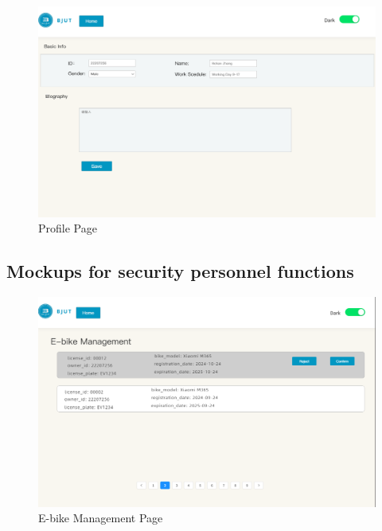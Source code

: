\documentclass[12pt]{article}
\begin{document}
\begin{figure}[H]
    \centering
    \includegraphics[width=\textwidth]{mockups/library/profile.png}
    \caption{Profile Page}
    \label{fig:library_profile_page}
\end{figure}

\subsection{Mockups for security personnel functions}

\begin{figure}[H]
    \centering
    \includegraphics[width=\textwidth]{mockups/security/ebikemanage.png}
    \caption{E-bike Management Page}
    \label{fig:security_ebikemanage_page}
\end{figure}
\end{document}
